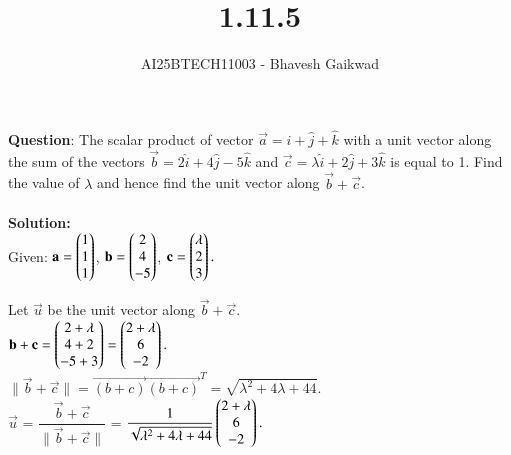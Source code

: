 \documentclass[journal]{IEEEtran}
\begin{document}

\vspace{3cm}

\title{1.11.5}
\author{AI25BTECH11003 - Bhavesh Gaikwad}
{\let\newpage\relax\maketitle}

\renewcommand{\thefigure}{\theenumi}
\renewcommand{\thetable}{\theenumi}
\setlength{\intextsep}{10pt} 


\renewcommand{\thetable}{\theenumi}


\textbf{Question}: The scalar product of vector $\overrightarrow{a} = \hat{i} + \hat{j} + \hat{k}$ with a unit vector along the sum of the vectors $\overrightarrow{b} =2\hat{i} + 4\hat{j} - 5\hat{k}$ and $\overrightarrow{c} = \lambda\hat{i} + 2\hat{j} + 3\hat{k}$ is equal to 1. Find the value of $\lambda$ and hence find the unit vector along $\overrightarrow{b} + \overrightarrow{c}$. \\\\

\textbf{Solution:}\\

 Given: $\mathbf{a}=\begin{pmatrix}1\\1\\1\end{pmatrix}$,  $\mathbf{b}=\begin{pmatrix}2\\4\\-5\end{pmatrix}$,  $\mathbf{c}=\begin{pmatrix}\lambda\\2\\3\end{pmatrix}.$

Let $\vec{u}$ be the unit vector along $\vec{b} + \vec{c} .$ \\

$ \mathbf{b} + \mathbf{c} = \begin{pmatrix}2+\lambda\\4+2\\-5+3\end{pmatrix}
=\begin{pmatrix}2+\lambda\\6\\-2\end{pmatrix}.$ \\

$\|\vec{b}+\vec{c}\| = \vec{(b+c)}\vec{(b+c)}^T
 = \sqrt{\lambda^2+4\lambda+44}.$ \\

$\vec{u}$ = $\dfrac{\vec{b} + \vec{c}}{\|\vec{b}+\vec{c}\|}$ = $\dfrac{1}{\sqrt{\lambda^2+4\lambda+44}} \begin{pmatrix}2+\lambda\\6\\-2\end{pmatrix}.$ \\\\
\end{document}
